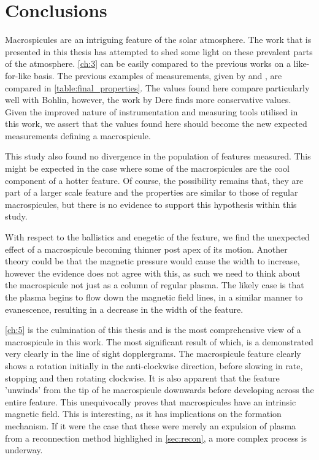 
\label{ch:conc}
\chapter{Conclusions}

Macrospicules are an intriguing feature of the solar atmosphere.
The work that is presented in this thesis has attempted to shed some light on these prevalent parts of the atmosphere.
\cref{ch:3} can be easily compared to the previous works on a like-for-like basis.
The previous examples of measurements, given by \cite{Bohlin1975} and \cite{Dere89}, are compared in \cref{table:final_properties}.
The values found here compare particularly well with Bohlin, however, the work by Dere finds more conservative values.
Given the improved nature of instrumentation and measuring tools utilised in this work, we assert that the values found here should become the new expected measurements defining a macrospicule.

This study also found no divergence in the population of features measured.
This might be expected in the case where some of the macrospicules are the cool component of a hotter feature.
Of course, the possibility remains that, they are part of a larger scale feature and the properties are similar to those of regular macrospicules, but there is no evidence to support this hypothesis within this study.   

With respect to the ballistics and enegetic of the feature, we find the unexpected effect of a macrospicule becoming thinner post apex of its motion.
Another theory could be that the magnetic pressure would cause the width to increase, however the evidence does not agree with this, as such we need to think about the macrospicule not just as a column of regular plasma.
The likely case is that the plasma begins to flow down the magnetic field lines, in a similar manner to evanescence, resulting in a decrease in the width of the feature.

\cref{ch:5} is the culmination of this thesis and is the most comprehensive view of a macrospicule in this work.
The most significant result of which, is a demonstrated very clearly in the line of sight dopplergrams.
The macrospicule feature clearly shows a rotation initially in the anti-clockwise direction, before slowing in rate, stopping and then rotating clockwise.
It is also apparent that the feature 'unwinds' from the tip of he macrospicule downwards before developing across the entire feature.  
This unequivocally proves that macrospicules have an intrinsic magnetic field.
This is interesting, as it has implications on the formation mechanism.
If it were the case that these were merely an expulsion of plasma from a reconnection method highlighed in \cref{sec:recon}, a more complex process is underway.

